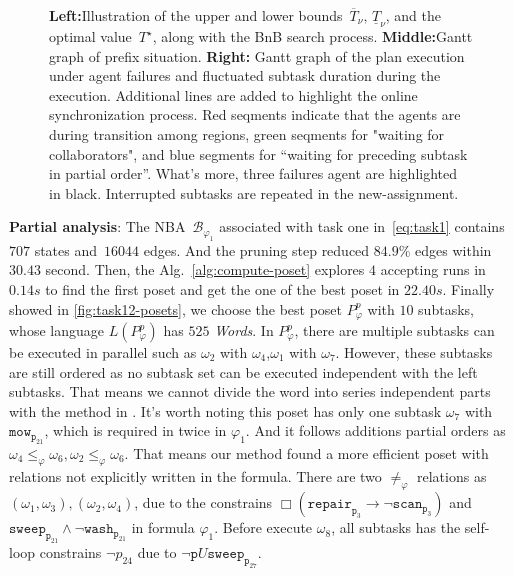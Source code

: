 \begin{figure}[t]
\begin{minipage}[t]{0.34\linewidth}
	\end{minipage}%
	\centering
	\caption{\textbf{Left:}Illustration of the upper and lower
		bounds~$\overline{T}_\nu,\,\underline{T}_\nu$, and the optimal value~$T^\star$,
		along with the BnB search process. \textbf{Middle:}Gantt graph of prefix situation. \textbf{Right:}
		Gantt graph of the plan execution under agent failures and fluctuated subtask duration during the execution.
		Additional lines are added to highlight the online synchronization process. Red seqments indicate that the agents
		are during transition among regions, green seqments for "waiting for collaborators", and blue segments for 
		“waiting for preceding subtask in partial order”. What's more, three failures agent are highlighted in black.
		Interrupted subtasks are repeated in the new-assignment.}
	\label{fig:online-failure-task}
\end{figure}


\textbf{Partial analysis}:
The NBA~$\mathcal{B}_{\varphi_1}$ associated with task one in~\eqref{eq:task1}
contains~$707$ states and~$16044$ edges. And the pruning step reduced $84.9\%$ edges within 
$30.43$ second. Then, the Alg.~\ref{alg:compute-poset} explores 
 $4$ accepting runs in $0.14s$ to find the first poset and get the one of the best poset in $22.40s$.
 Finally showed in \ref{fig:task12-posets}, we choose the best poset $P^{p}_{\varphi}$ with $10$ subtasks, whose language 
 $L(P^{p}_{\varphi})$ has $525$ \emph{Words}. In $P^{p}_{\varphi}$, there are 
 multiple subtasks can be executed in parallel such as $\omega_2 $ with $ \omega_4$,$\omega_1 $ with $ \omega_7$.
 However, these subtasks are still ordered as no subtask set can be executed independent with the left 
 subtasks. That means we cannot
 divide the word into series independent parts with the method in \cite{schillinger2018simultaneous}.
 It's worth noting this poset has only one subtask $\omega_7$ with $\texttt{mow}_{\texttt{p}_{21}}$,
 which is required in twice in $\varphi_1$. And it follows additions partial orders as
 $\omega_4\leq_\varphi \omega_6,\omega_2\leq_\varphi \omega_6$. That means our method found 
 a more efficient poset with relations not explicitly written in the formula.
 There are two $\neq_\varphi$ relations as $(\omega_1,\omega_3),(\omega_2,\omega_4)$, due to the constrains 
 $\Box(\texttt{repair}_{\texttt{p}_3}\rightarrow\lnot\texttt{scan}_{\texttt{p}_3}) $ and
  $\texttt{sweep}_{\texttt{p}_{21}} \wedge \lnot \texttt{wash}_{\texttt{p}_{21}}$ in formula $\varphi_1$.
  Before execute $\omega_8$, all subtasks has the self-loop constrains $\lnot p_{24}$ due to
   $\lnot \texttt{p} U \texttt{sweep}_{\texttt{p}_{27}}$.
   

